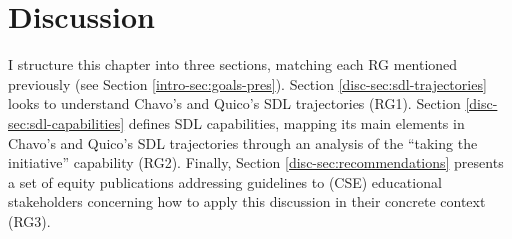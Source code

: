 \chapter{Discussion}
\label{chap:discussion}

 I structure this chapter into three sections, matching each \acrfull{RG} mentioned previously (see Section \ref{intro-sec:goals-pres}). Section \ref{disc-sec:sdl-trajectories} looks to understand Chavo's and Quico's \gls{SDL} trajectories (\gls{RG}1). Section \ref{disc-sec:sdl-capabilities} defines \gls{SDL} capabilities, mapping its main elements in Chavo's and Quico's \gls{SDL} trajectories through an analysis of the ``taking the initiative'' capability (\gls{RG}2). Finally, Section \ref{disc-sec:recommendations} presents a set of equity publications addressing guidelines to (\gls{CSE}) educational stakeholders concerning how to apply this discussion in their concrete context (\gls{RG}3).